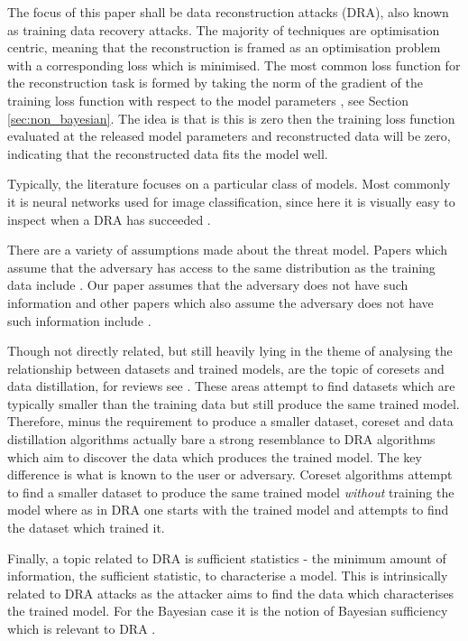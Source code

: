 \documentclass[hyperref]{article}
\theoremstyle{plain}
\theoremstyle{remark}
\begin{document}
The focus of this paper shall be data reconstruction attacks (DRA), also known as training data recovery attacks. The majority of techniques are optimisation centric, meaning that the reconstruction is framed as an optimisation problem with a corresponding loss which is minimised. The most common loss function for the reconstruction task is formed by taking the norm of the gradient of the training loss function with respect to the model parameters \citep{Haim2022,buzaglo2023deconstructing,Loo2023}, see Section \ref{sec:non_bayesian}. The idea is that is this is zero then the training loss function evaluated at the released model parameters and reconstructed data will be zero, indicating that the reconstructed data fits the model well. 

Typically, the literature focuses on a particular class of models. Most commonly it is neural networks used for image classification, since here it is visually easy to inspect when a DRA has succeeded \citep{Loo2023,Haim2022,Guo2022_bounding,Runkel2024}.

There are a variety of assumptions made about the threat model. Papers which assume that the adversary has access to the same distribution as the training data include \citet{Kaissis2023_hypothesis,Balle2022_informed,Hayes203_dpsgd}. Our paper assumes that the adversary does not have such information and other papers which also assume the adversary does not have such information include \citet{Haim2022,Loo2023,buzaglo2023deconstructing,Runkel2024}.

Though not directly related, but still heavily lying in the theme of analysing the relationship between datasets and trained models, are the topic of coresets and data distillation, for reviews see \citet{winter2023_future,sachdeva_2023_distillation}. These areas attempt to find datasets which are typically smaller than the training data but still produce the same trained model. Therefore, minus the requirement to produce a smaller dataset, coreset and data distillation algorithms actually bare a strong resemblance to DRA algorithms which aim to discover the data which produces the trained model. The key difference is what is known to the user or adversary. Coreset algorithms attempt to find a smaller dataset to produce the same trained model \textit{without} training the model where as in DRA one starts with the trained model and attempts to find the dataset which trained it. 

Finally, a topic related to DRA is sufficient statistics \citep{Casella2024} - the minimum amount of information, the sufficient statistic, to characterise a model. This is intrinsically related to DRA attacks as the attacker aims to find the data which characterises the trained model. For the Bayesian case it is the notion of Bayesian sufficiency which is relevant to DRA \citep{Blackwell1982,Bernardo1994}.
\end{document}
